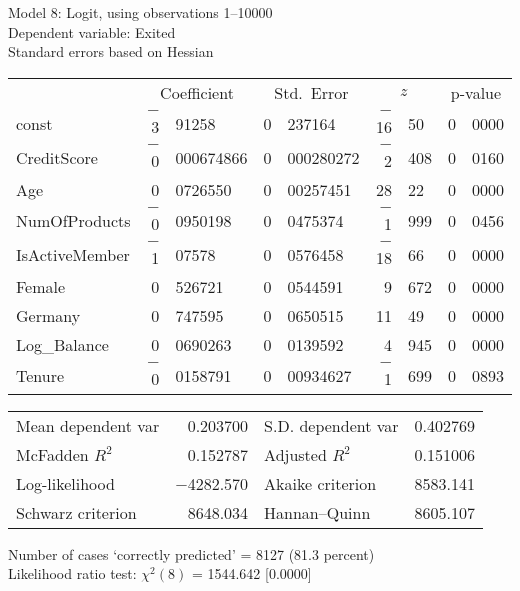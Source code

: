 \documentclass[11pt]{article}
\begin{document}
\thispagestyle{empty}

\begin{center}

Model 8: Logit, using observations 1--10000\\
Dependent variable: Exited\\
Standard errors based on Hessian

\vspace{1em}

\begin{tabular}{lr@{.}lr@{.}lr@{.}lr@{.}l}
  &
 \multicolumn{2}{c}{Coefficient} &
  \multicolumn{2}{c}{Std.\ Error} &
   \multicolumn{2}{c}{$z$} &
    \multicolumn{2}{c}{p-value} \\[1ex]
const &
  $-$3&91258 &
    0&237164 &
      $-$16&50 &
        0&0000 \\
CreditScore &
  $-$0&000674866 &
    0&000280272 &
      $-$2&408 &
        0&0160 \\
Age &
  0&0726550 &
    0&00257451 &
      28&22 &
        0&0000 \\
NumOfProducts &
  $-$0&0950198 &
    0&0475374 &
      $-$1&999 &
        0&0456 \\
IsActiveMember &
  $-$1&07578 &
    0&0576458 &
      $-$18&66 &
        0&0000 \\
Female &
  0&526721 &
    0&0544591 &
      9&672 &
        0&0000 \\
Germany &
  0&747595 &
    0&0650515 &
      11&49 &
        0&0000 \\
Log\_Balance &
  0&0690263 &
    0&0139592 &
      4&945 &
        0&0000 \\
Tenure &
  $-$0&0158791 &
    0&00934627 &
      $-$1&699 &
        0&0893 \\
\end{tabular}

\vspace{1ex}
\begin{tabular}{lrlr}
Mean dependent var &  0.203700 & S.D. dependent var &  0.402769 \\
McFadden $R^2$ &  0.152787 & Adjusted $R^2$ &  0.151006 \\
Log-likelihood & $-$4282.570 & Akaike criterion &  8583.141 \\
Schwarz criterion &  8648.034 & Hannan--Quinn &  8605.107 \\
\end{tabular}


\vspace{1ex}
\vspace{1em}
\begin{raggedright}
Number of cases `correctly predicted' = 8127 (81.3 percent)\\
Likelihood ratio test: $\chi^2(8)$ = 1544.642 [0.0000]\\
\end{raggedright}

\end{center}
\end{document}
